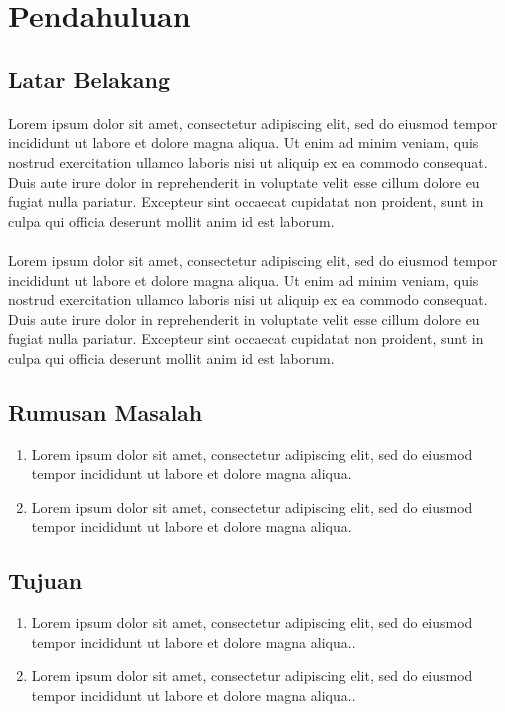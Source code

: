 \section{Pendahuluan}

\subsection{Latar Belakang}
\paragraph{}Lorem ipsum dolor sit amet, consectetur adipiscing elit, sed do eiusmod tempor incididunt ut labore et dolore magna aliqua. Ut enim ad minim veniam, quis nostrud exercitation ullamco laboris nisi ut aliquip ex ea commodo consequat. Duis aute irure dolor in reprehenderit in voluptate velit esse cillum dolore eu fugiat nulla pariatur. Excepteur sint occaecat cupidatat non proident, sunt in culpa qui officia deserunt mollit anim id est laborum.
\paragraph{}Lorem ipsum dolor sit amet, consectetur adipiscing elit, sed do eiusmod tempor incididunt ut labore et dolore magna aliqua. Ut enim ad minim veniam, quis nostrud exercitation ullamco laboris nisi ut aliquip ex ea commodo consequat. Duis aute irure dolor in reprehenderit in voluptate velit esse cillum dolore eu fugiat nulla pariatur. Excepteur sint occaecat cupidatat non proident, sunt in culpa qui officia deserunt mollit anim id est laborum.
\subsection{Rumusan Masalah}
\begin{enumerate}
    \item Lorem ipsum dolor sit amet, consectetur adipiscing elit, sed do eiusmod tempor incididunt ut labore et dolore magna aliqua.
    \item Lorem ipsum dolor sit amet, consectetur adipiscing elit, sed do eiusmod tempor incididunt ut labore et dolore magna aliqua.
\end{enumerate}
\subsection{Tujuan}
\begin{enumerate}
    \item Lorem ipsum dolor sit amet, consectetur adipiscing elit, sed do eiusmod tempor incididunt ut labore et dolore magna aliqua..
    \item Lorem ipsum dolor sit amet, consectetur adipiscing elit, sed do eiusmod tempor incididunt ut labore et dolore magna aliqua..
\end{enumerate}
\newpage